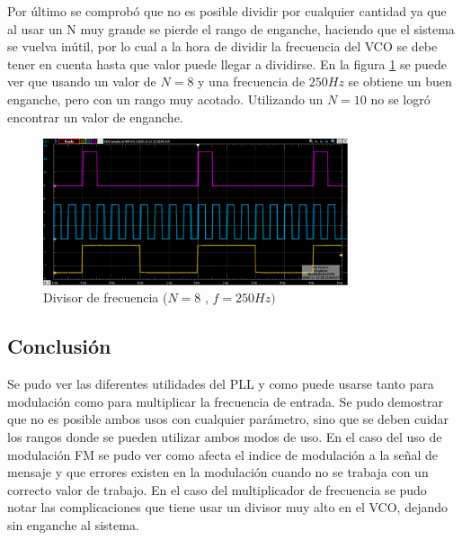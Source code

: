 Por último se comprobó que no es posible dividir por cualquier cantidad ya que al usar un N muy grande se pierde el rango de enganche, haciendo que el sistema se vuelva inútil, por lo cual a la hora de dividir la frecuencia del VCO se debe tener en cuenta hasta que valor puede llegar a dividirse. En la figura \ref{fig:Div8Frec250} se puede ver que usando un valor de $N=8$ y una frecuencia de $250Hz$ se obtiene un buen enganche, pero con un rango muy acotado. Utilizando un $N=10$ no se logró encontrar un valor de enganche.

\begin{figure}[H]
	\includegraphics[width= 0.8\textwidth]{../1. PLL/Imagenes/DIV8f250.png}
	\centering
	\caption{Divisor de frecuencia ($N=8$ , $f=250Hz)$}
	\label{fig:Div8Frec250}
\end{figure}

\subsection{Conclusión}
Se pudo ver las diferentes utilidades del PLL y como puede usarse tanto para modulación como para multiplicar la frecuencia de entrada. Se pudo demostrar que no es posible ambos usos con cualquier parámetro, sino que se deben cuidar los rangos donde se pueden utilizar ambos modos de uso. 
\newline
En el caso del uso de modulación FM se pudo ver como afecta el indice de modulación a la señal de mensaje y que errores existen en la modulación cuando no se trabaja con un correcto valor de trabajo.
\newline
En el caso del multiplicador de frecuencia se pudo notar las complicaciones que tiene usar un divisor muy alto en el VCO, dejando sin enganche al sistema. 